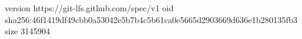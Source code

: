 version https://git-lfs.github.com/spec/v1
oid sha256:46f1419df49cbb0a53042e5b7b4c5b61ca0e5665d2903669d636e1b280135fb3
size 3145904
